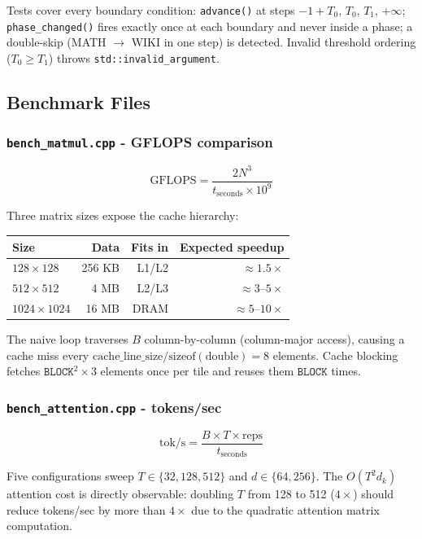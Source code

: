 \documentclass[12pt, a4paper]{article}
\begin{document}
Tests cover every boundary condition: \texttt{advance()} at steps $-1+T_0$,
$T_0$, $T_1$, $+\infty$; \texttt{phase\_changed()} fires exactly once at each
boundary and never inside a phase; a double-skip (MATH $\to$ WIKI in one step)
is detected.  Invalid threshold ordering ($T_0 \geq T_1$) throws
\texttt{std::invalid\_argument}.

\subsection{Benchmark Files}

\subsubsection{\texttt{bench\_matmul.cpp} - GFLOPS comparison}

\[
  \text{GFLOPS} = \frac{2N^3}{t_{\text{seconds}} \times 10^9}
\]

Three matrix sizes expose the cache hierarchy:

\begin{table}[!ht]
\centering
\renewcommand{\arraystretch}{1.3}
\begin{tabular}{@{} l r r r @{}}
\toprule
\textbf{Size} & \textbf{Data} & \textbf{Fits in} & \textbf{Expected speedup} \\
\midrule
$128 \times 128$ & 256 KB & L1/L2    & $\approx 1.5\times$ \\
$512 \times 512$ & 4 MB   & L2/L3    & $\approx 3\text{--}5\times$ \\
$1024 \times 1024$ & 16 MB & DRAM  & $\approx 5\text{--}10\times$ \\
\bottomrule
\end{tabular}
\end{table}

The naive loop traverses $B$ column-by-column (column-major access), causing a
cache miss every $\text{cache\_line\_size}/\text{sizeof}(\text{double}) = 8$
elements.  Cache blocking fetches $\texttt{BLOCK}^2 \times 3$ elements once per
tile and reuses them $\texttt{BLOCK}$ times.

\subsubsection{\texttt{bench\_attention.cpp} - tokens/sec}

\[
  \text{tok/s} = \frac{B \times T \times \text{reps}}{t_{\text{seconds}}}
\]

Five configurations sweep $T \in \{32, 128, 512\}$ and $d \in \{64, 256\}$.
The $O(T^2 d_k)$ attention cost is directly observable: doubling $T$ from 128
to 512 ($4\times$) should reduce tokens/sec by more than $4\times$ due to the
quadratic attention matrix computation.
\end{document}
